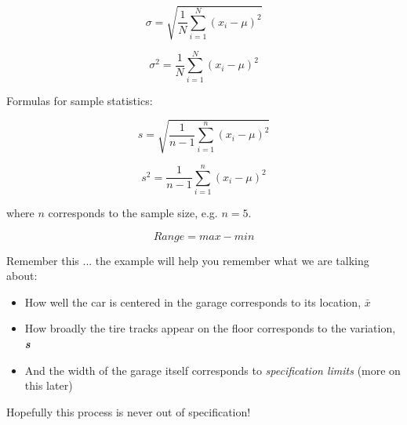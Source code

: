 \begin{center}
\begin{equation}
\sigma = \sqrt{\frac{1}{N}\displaystyle\sum_{i=1}^{N}{\left( x_{i}-\mu\right)}^2 }
\end{equation}

\begin{equation}
\sigma^{2} = {\frac{1}{N}\displaystyle\sum_{i=1}^{N}{\left( x_{i}-\mu\right)}^2 }
\end{equation}
\end{center}

Formulas for sample statistics:\\

\begin{center}
\begin{equation}
s = \sqrt{\frac{1}{n-1}\displaystyle\sum_{i=1}^{n}{\left( x_{i}-\mu\right)}^2 }
\end{equation}

\begin{equation}
s^{2} = {\frac{1}{n-1}\displaystyle\sum_{i=1}^{n}{\left( x_{i}-\mu\right)}^2 }
\end{equation}
\end{center}

where $ n $ corresponds to the sample size, e.g.  $ n = 5$.\\

\begin{center}
\begin{equation}
Range = max - min
\end{equation}

\end{center}
Remember this ... the example will help you remember what we are talking about:\\

  \begin{itemize}
  \item How well the car is centered in the garage corresponds to its location, $ \bar{x} $
  \item How broadly the tire tracks appear on the floor corresponds to the variation, \textbf{\textit{s}}
  \item And the width of the garage itself corresponds to  \textit{specification limits} (more on this later)
  \end{itemize}
Hopefully this process is never out of specification!

